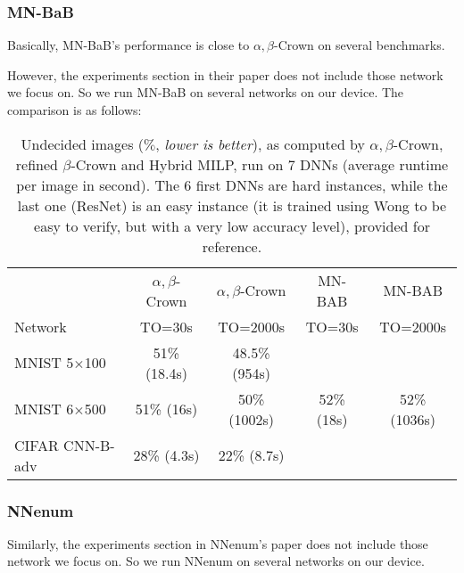 \subsubsection*{MN-BaB} 


Basically, MN-BaB's performance is close to $\alpha,\beta$-Crown on several benchmarks. 

However, the experiments section in their paper does not include those network we focus on. So we run MN-BaB on several networks on our device. The comparison is as follows:


\begin{table}[h!]
	\centering
	\begin{tabular}{||l||c|c||c|c||}
		\hline \hline
		 & $\alpha,\beta$-Crown & $\alpha,\beta$-Crown & MN-BAB & MN-BAB \\ 
		 Network & TO=30s & TO=2000s &  TO=30s & TO=2000s \\ 
		\hline
		MNIST 5$\times$100 & 51\% (18.4s) & 48.5\%(954s) &  & \\ \hline
		MNIST 6$\times$500 & 51\% (16s) & 50\% (1002s) & 52\% (18s) & 52\% (1036s) \\ \hline
		CIFAR CNN-B-adv & 28\% (4.3s) & 22\% (8.7s) &  & \\ \hline 
	\end{tabular}
	\caption{Undecided images ($\%$, {\em lower is better}), as computed by $\alpha,\beta$-Crown, refined $\beta$-Crown and Hybrid MILP, run on 7 DNNs (average runtime per image in second). The 6 first DNNs are hard instances, while the last one (ResNet) is an easy instance (it is trained using Wong to be easy to verify, but with a very low accuracy level), provided for reference.}
	\end{table}





\subsubsection*{NNenum} 

Similarly, the experiments section in NNenum's paper does not include those network we focus on. So we run NNenum on several networks on our device. 

